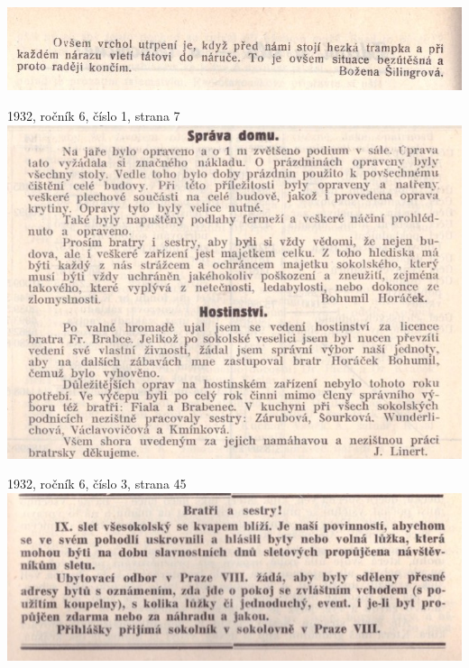 \documentclass[11pt]{article}
\begin{document}
\includegraphics[width=\imagewidth]{original/1931/Skener_20250315 (9).jpg}




\clearpage

1932, ročník 6, číslo 1, strana 7 \\
\includegraphics[width=\imagewidth]{original/1932/Skener_20250320 (5).jpg}

1932, ročník 6, číslo 3, strana 45 \\
\includegraphics[width=\imagewidth]{original/1932/Skener_20250320 (6).jpg}
\end{document}
